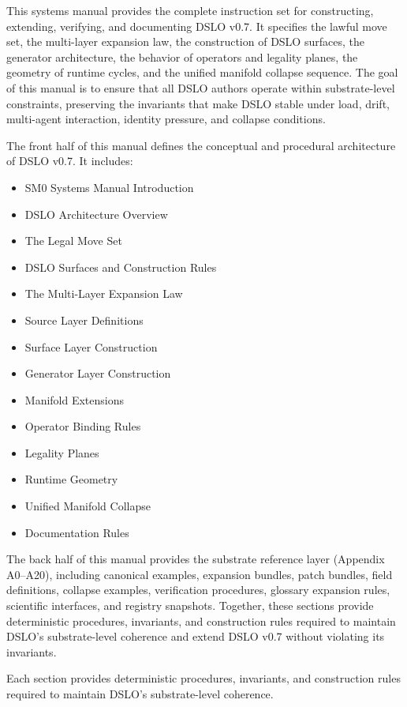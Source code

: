 This systems manual provides the complete instruction set for constructing, extending, verifying, and documenting DSLO v0.7. It specifies the lawful move set, the multi-layer expansion law, the construction of DSLO surfaces, the generator architecture, the behavior of operators and legality planes, the geometry of runtime cycles, and the unified manifold collapse sequence. The goal of this manual is to ensure that all DSLO authors operate within substrate-level constraints, preserving the invariants that make DSLO stable under load, drift, multi-agent interaction, identity pressure, and collapse conditions.

The front half of this manual defines the conceptual and procedural architecture of DSLO v0.7. It includes:

\begin{itemize}
    \item SM0 Systems Manual Introduction
    \item DSLO Architecture Overview
    \item The Legal Move Set
    \item DSLO Surfaces and Construction Rules
    \item The Multi-Layer Expansion Law
    \item Source Layer Definitions
    \item Surface Layer Construction
    \item Generator Layer Construction
    \item Manifold Extensions
    \item Operator Binding Rules
    \item Legality Planes
    \item Runtime Geometry
    \item Unified Manifold Collapse
    \item Documentation Rules
\end{itemize}

The back half of this manual provides the substrate reference layer (Appendix A0–A20), including canonical examples, expansion bundles, patch bundles, field definitions, collapse examples, verification procedures, glossary expansion rules, scientific interfaces, and registry snapshots. Together, these sections provide deterministic procedures, invariants, and construction rules required to maintain DSLO’s substrate-level coherence and extend DSLO v0.7 without violating its invariants.


Each section provides deterministic procedures, invariants, and construction rules required to maintain DSLO’s substrate-level coherence.


